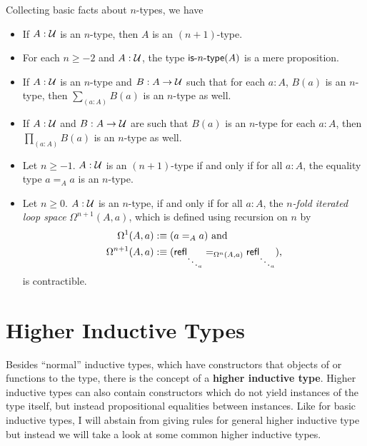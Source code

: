 Collecting basic facts about $n$-types, we have
\begin{lemma}
\begin{itemize}
\item If $A : \mathcal{U}$ is an $n$-type, then $A$ is an $(n+1)$-type.
\item For each $n \geq -2$ and $A : \mathcal{U}$, the type $\mathsf{is}\mbox{-}{n}\mbox{-}\mathsf{type}(A)$ is a mere
proposition.
\item If $A : \mathcal{U}$ is an $n$-type and $B : A \to \mathcal{U}$ such that for each $a : A$,
$B(a)$ is an $n$-type, then $\sum_{(a : A)} B(a)$ is an $n$-type as well.
\item If $A : \mathcal{U}$ and $B : A \to \mathcal{U}$ are such that $B(a)$ is an $n$-type for each
$a : A$, then $\prod_{(a : A)} B(a)$ is an $n$-type as well.
\item Let $n \geq -1$. $A : \mathcal{U}$ is an $(n+1)$-type if and only if for all $a : A$,
the equality type $a =_A a$ is an $n$-type.
\item Let $n \geq 0$. $A : \mathcal{U}$ is an $n$-type, if and only if for all $a : A$,
the \emph{$n$-fold iterated loop space} $\Omega^{n+1}(A, a)$, which is defined using
recursion on $n$ by
\begin{align*}
\Omega^1(A, a) &:\equiv (a =_A a) \text{ and}\\
\Omega^{n+1}(A, a) &:\equiv (\mathsf{refl}_{\ddots_a} =_{\Omega^n(A,a)} \mathsf{refl}_{\ddots_a}) \text{,}
\end{align*}
is contractible.
\end{itemize}
\end{lemma}

\section{Higher Inductive Types}

Besides ``normal'' inductive types, which have constructors that objects of or
functions to the type, there is the concept of a \textbf{higher inductive type}.
Higher inductive types can also contain constructors which do not yield instances
of the type itself, but instead propositional equalities between instances.
Like for basic inductive types, I will abstain from giving rules for general
higher inductive type but instead we will take a look at some common higher inductive
types.

